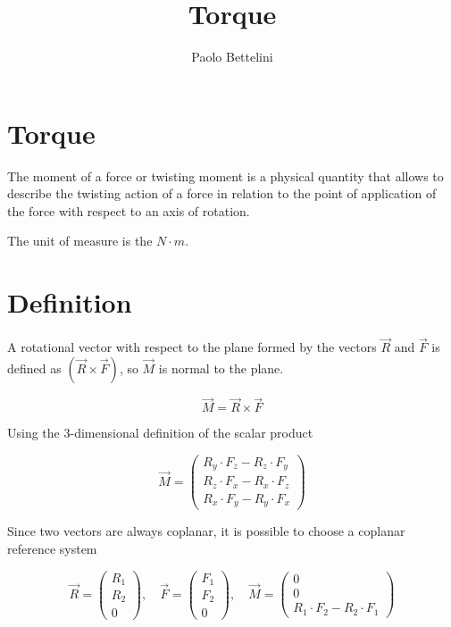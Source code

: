 \documentclass[a4paper]{article}
\title{Torque}
\author{Paolo Bettelini}
\date{}
\begin{document}
\maketitle
\tableofcontents
\pagebreak

\section{Torque}

The moment of a force or twisting moment is a physical quantity
that allows to describe the twisting action of a force in relation
to the point of application of the force with respect to an axis of rotation.

The unit of measure is the \(N\cdot m\).

\section{Definition}

A rotational vector with respect to the plane formed by the vectors
\(\vec{R}\) and \(\vec{F}\) is defined as \((\vec{R}\times\vec{F})\), so \(\vec{M}\) is normal to the plane.

\[
    \vec{M}=\vec{R}\times\vec{F}
\]

Using the \(3\)-dimensional definition of the scalar product

\[
    \vec{M}=
    \begin{pmatrix}
        R_y \cdot F_z - R_z \cdot F_y \\
        R_z \cdot F_x - R_x \cdot F_z \\
        R_x \cdot F_y - R_y \cdot F_x
    \end{pmatrix}
\]

Since two vectors are always coplanar, it is possible to choose a coplanar reference system

\[
    \vec{R}=
    \begin{pmatrix}
        R_1 \\
        R_2 \\
        0
    \end{pmatrix}
    ,\quad
    \vec{F}=
    \begin{pmatrix}
        F_1 \\
        F_2 \\
        0
    \end{pmatrix}
    ,\quad
    \vec{M}=
    \begin{pmatrix}
        0 \\
        0 \\
        R_1 \cdot F_2 - R_2 \cdot F_1
    \end{pmatrix}
\]
\end{document}
